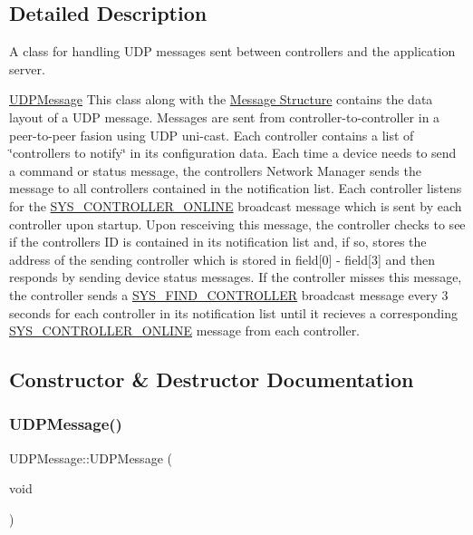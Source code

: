 \subsection{Detailed Description}
A class for handling U\+DP messages sent between controllers and the application server. 

\hyperlink{class_u_d_p_message}{U\+D\+P\+Message} This class along with the \hyperlink{struct_u_d_p_message_struct}{Message Structure} contains the data layout of a U\+DP message. Messages are sent from controller-\/to-\/controller in a peer-\/to-\/peer fasion using U\+DP uni-\/cast. Each controller contains a list of \char`\"{}controllers to notify\char`\"{} in its configuration data. Each time a device needs to send a command or status message, the controller\textquotesingle{}s Network Manager sends the message to all controllers contained in the notification list. Each controller listens for the \hyperlink{group___u_d_p_message_i_d_ga23aab89076591390a1dbc412a3a07314}{S\+Y\+S\+\_\+\+C\+O\+N\+T\+R\+O\+L\+L\+E\+R\+\_\+\+O\+N\+L\+I\+NE} broadcast message which is sent by each controller upon startup. Upon resceiving this message, the controller checks to see if the controller\textquotesingle{}s ID is contained in its notification list and, if so, stores the address of the sending controller which is stored in field\mbox{[}0\mbox{]} -\/ field\mbox{[}3\mbox{]} and then responds by sending device status messages. If the controller misses this message, the controller sends a \hyperlink{group___u_d_p_message_i_d_gadfda0e5a5a6a08de555dd55182a4cd87}{S\+Y\+S\+\_\+\+F\+I\+N\+D\+\_\+\+C\+O\+N\+T\+R\+O\+L\+L\+ER} broadcast message every 3 seconds for each controller in its notification list until it recieves a corresponding \hyperlink{group___u_d_p_message_i_d_ga23aab89076591390a1dbc412a3a07314}{S\+Y\+S\+\_\+\+C\+O\+N\+T\+R\+O\+L\+L\+E\+R\+\_\+\+O\+N\+L\+I\+NE} message from each controller. 

\subsection{Constructor \& Destructor Documentation}
\mbox{\label{class_u_d_p_message_a823351519fc5818ccc03030c6947e620}} 
\subsubsection{\texorpdfstring{U\+D\+P\+Message()}{UDPMessage()}\hspace{0.1cm}{\footnotesize\ttfamily [1/3]}}
{\footnotesize\ttfamily U\+D\+P\+Message\+::\+U\+D\+P\+Message (\begin{DoxyParamCaption}\item[{void}]{ }\end{DoxyParamCaption})}

